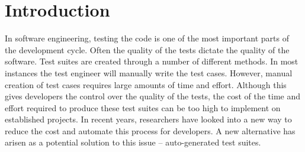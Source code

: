 \documentclass[conference]{IEEEtran}
\begin{document}
\maketitle
\begin{abstract}

\end{abstract}





\section{Introduction}
In software engineering, testing the code is one of the most important parts of the development cycle. Often the quality of the tests dictate the quality of the software. Test suites are created through a number of different methods. In most instances the test engineer will manually write the test cases. However, manual creation of test cases requires large amounts of time and effort. Although this gives developers the control over the quality of the tests, the cost of the time and effort required to produce these test suites can be too high to implement on established projects. In recent years, researchers have looked into a new way to reduce the cost and automate this process for developers. A new alternative has arisen as a potential solution to this issue -- auto-generated test suites. 
\end{document}
